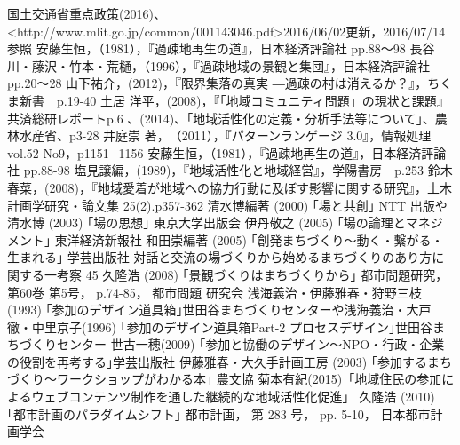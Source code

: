 \documentclass[a4paper]{jsarticle}
\begin{document}
\begin{thebibliography}{999}


国土交通省重点政策(2016)、<http://www.mlit.go.jp/common/001143046.pdf>2016/06/02更新，2016/07/14参照
安藤生恒，（1981），『過疎地再生の道』，日本経済評論社 pp.88～98
長谷川・藤沢・竹本・荒樋，（1996），『過疎地域の景観と集団』，日本経済評論社 pp.20～28
山下祐介，(2012)，『限界集落の真実 ―過疎の村は消えるか？』，ちくま新書　p.19-40
土居 洋平，(2008)，『｢地域コミュニティ問題」の現状と課題』共済総研レポートp.6
\cite{kasseika}、(2014)、「地域活性化の定義・分析手法等について」、農林水産省、p3-28
井庭崇 著，‎（2011），『パターンランゲージ 3.0』，情報処理vol.52 No9，p1151−1156
安藤生恒，（1981），『過疎地再生の道』，日本経済評論社 pp.88-98
塩見譲編，(1989)，『地域活性化と地域経営』，学陽書房　p.253
鈴木春菜，(2008)，『地域愛着が地域への協力行動に及ぼす影響に関する研究』，土木計画学研究・論文集 25(2).p357-362
清水博編著 (2000) ｢場と共創｣ NTT 出版や清水博 (2003) ｢場の思想｣ 東京大学出版会
伊丹敬之 (2005) ｢場の論理とマネジメント｣ 東洋経済新報社
和田崇編著 (2005) ｢創発まちづくり～動く・繋がる・生まれる｣ 学芸出版社 対話と交流の場づくりから始めるまちづくりのあり方に関する一考察 45
久隆浩 (2008) ｢景観づくりはまちづくりから｣ 都市問題研究， 第60巻 第5号， p.74-85， 都市問題 研究会
浅海義治・伊藤雅春・狩野三枝(1993) ｢参加のデザイン道具箱｣世田谷まちづくりセンターや浅海義治・大戸徹・中里京子(1996) ｢参加のデザイン道具箱Part-2 プロセスデザイン｣世田谷まちづくりセンター
世古一穂(2009) ｢参加と協働のデザイン～NPO・行政・企業の役割を再考する｣学芸出版社
伊藤雅春・大久手計画工房 (2003) ｢参加するまちづくり～ワークショップがわかる本｣ 農文協
菊本有紀(2015)「地域住民の参加によるウェブコンテンツ制作を通した継続的な地域活性化促進」
久隆浩 (2010) ｢都市計画のパラダイムシフト｣ 都市計画， 第 283 号， pp. 5-10， 日本都市計画学会


\end{thebibliography}

\newpage
\end{document}
